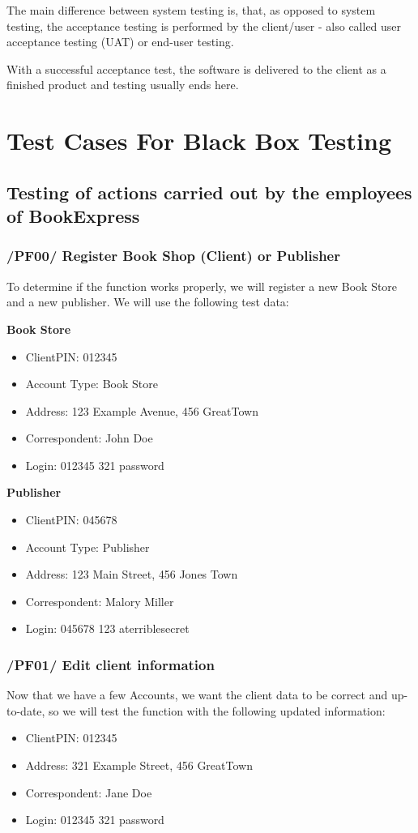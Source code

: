 \documentclass[11pt,a4paper,oneside,svgnames]{report}
\begin{document}
The main difference between system testing is, that, as opposed to system testing, the acceptance testing is performed by the client/user - also called user acceptance testing (UAT) or end-user testing.

With a successful acceptance test, the software is delivered to the client as a finished product and testing usually ends here.

\chapter{Test Cases For Black Box Testing}
\section{Testing of actions carried out by the employees of BookExpress}
\subsection{/PF00/ Register Book Shop (Client) or Publisher}
To determine if the function works properly, we will register a new Book Store and a new publisher. 
We will use the following test data:
 
\begin{center}
\textbf{Book Store}
\begin{itemize}
\item{ClientPIN: 012345}
\item{Account Type: Book Store}
\item{Address: 123 Example Avenue, 456 GreatTown}
\item{Correspondent: John Doe}
\item{Login: 012345 321 password}
\end{itemize}
\textbf{Publisher}
\begin{itemize}
\item{ClientPIN: 045678}
\item{Account Type: Publisher}
\item{Address: 123 Main Street, 456 Jones Town}
\item{Correspondent: Malory Miller}
\item{Login: 045678 123 aterriblesecret}
\end{itemize}
\end{center}
\subsection{/PF01/ Edit client information}
Now that we have a few Accounts, we want the client data to be correct and up-to-date, so we will test the function with the following updated information:
\begin{itemize}
\item{ClientPIN: 012345}
\item{Address: 321 Example Street, 456 GreatTown}
\item{Correspondent: Jane Doe}
\item{Login: 012345 321 password}
\end{itemize}
\end{document}
